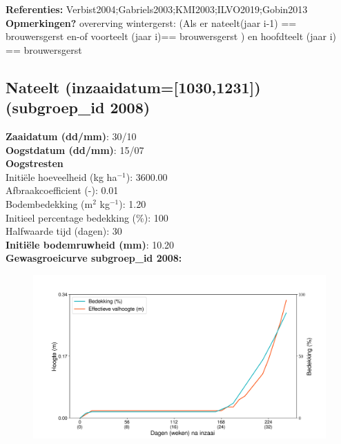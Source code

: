 \documentclass{article}
\begin{document}
  \textbf{Referenties:} Verbist2004;Gabriels2003;KMI2003;ILVO2019;Gobin2013 \vspace{0.10cm} \\ 
  \textbf{Opmerkingen?} overerving wintergerst: (Als er nateelt(jaar i-1) == brouwersgerst en-of voorteelt (jaar i)== brouwersgerst ) en hoofdteelt (jaar i) == brouwersgerst \vspace{0.10cm} \\ 
 \newpage 
 \subsection{Nateelt (inzaaidatum=[1030,1231]) (subgroep\_id 2008)} 
  \textbf{Zaaidatum (dd/mm)}: 30/10  \vspace{0.10cm} \\ 
  \textbf{Oogstdatum (dd/mm)}: 15/07  \vspace{0.10cm} \\ 
  \textbf{Oogstresten} \vspace{0.05cm} \\ 
  \tab Initi\"{e}le hoeveelheid (kg ha$^{-1}$): 3600.00 \vspace{0.05cm} \\ 
  \tab Afbraakcoefficient (-): 0.01 \vspace{0.05cm} \\ 
  \tab Bodembedekking (m$^2$ kg$^{-1}$): 1.20 \vspace{0.05cm} \\ 
  \tab Initieel percentage bedekking (\%): 100 \vspace{0.05cm} \\ 
  \tab Halfwaarde tijd (dagen): 30 \vspace{0.05cm} \\ 
  \textbf{Initi\"{e}le bodemruwheid (mm)}: 10.20 \vspace{0.05cm} \\ 
  \textbf{Gewasgroeicurve subgroep\_id 2008:} 
 \begin{center} \begin{figure}[H] \includegraphics[width=12.5cm]{temp/2008.png} \end{figure} \end{center} 
\end{document}
